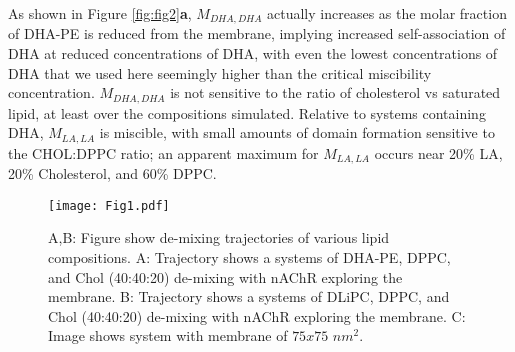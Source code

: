 	As shown in Figure \ref{fig:fig2}\textbf{a},  $M_{DHA,DHA}$ actually increases as the molar fraction of DHA-PE is reduced from the membrane, implying increased self-association of DHA at reduced concentrations of DHA, with even the lowest concentrations of DHA that we used here seemingly higher than the critical miscibility concentration.  $M_{DHA,DHA}$ is not sensitive to the ratio of cholesterol vs saturated lipid, at least over the compositions simulated.   Relative to systems containing DHA, $M_{LA,LA}$ is miscible, with small amounts of domain formation sensitive to the CHOL:DPPC ratio; an apparent maximum for $M_{LA,LA}$ occurs near 20\% LA, 20\% Cholesterol, and 60\% DPPC.  

	\begin{figure*}[t]
		\center
		\texttt{[image: Fig1.pdf]}
		\caption{ A,B: Figure show de-mixing trajectories of various lipid compositions.  A: Trajectory shows a systems of DHA-PE, DPPC, and Chol (40:40:20) de-mixing with nAChR exploring the membrane. B: Trajectory shows a systems of DLiPC, DPPC, and Chol (40:40:20) de-mixing with nAChR exploring the membrane. C: Image shows system with membrane of $75x75$ $nm^2$.} 
		\label{fig:fig1}
	\end{figure*}

	
